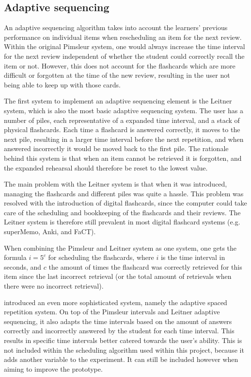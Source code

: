         \subsection{Adaptive sequencing}
        \label{subsec:adaptivesequencing}

An adaptive sequencing algorithm takes into account the learners' previous performance on individual items when rescheduling an item for the next review. Within the original Pimsleur system, one would always increase the time interval for the next review independent of whether the student could correctly recall the item or not. However, this does not account for the flashcards which are more difficult or forgotten at the time of the new review, resulting in the user not being able to keep up with those cards.

The first system to implement an adaptive sequencing element is the Leitner system, which is also the most basic adaptive sequencing system. The user has a number of piles, each representative of a expanded time interval, and a stack of physical flashcards. Each time a flashcard is answered correctly, it moves to the next pile, resulting in a larger time interval before the next repetition, and when answered incorrectly it would be moved back to the first pile. The rationale behind this system is that when an item cannot be retrieved it is forgotten, and the expanded rehearsal should therefore be reset to the lowest value.

The main problem with the Leitner system is that when it was introduced, managing the flashcards and different piles was quite a hassle. This problem was resolved with the introduction of digital flashcards, since the computer could take care of the scheduling and bookkeeping of the flashcards and their reviews. The Leitner system is therefore still prevalent in most digital flashcard systems (e.g. superMemo, Anki, and FaCT).

When combining the Pimsleur and Leitner system as one system, one gets the formula $i = 5^c$ for scheduling the flashcards, where $i$ is the time interval in seconds, and $c$ the amount of times the flashcard was correctly retrieved for this item since the last incorrect retrieval (or the total amount of retrievals when there were no incorrect retrieval).

 introduced an even more sophisticated system, namely the adaptive spaced repetition system. On top of the Pimsleur intervals and Leitner adaptive sequencing, it also adapts the time intervals based on the amount of answers correctly and incorrectly answered by the student for each time interval. This results in specific time intervals better catered towards the user's ability. This is not included within the scheduling algorithm used within this project, because it adds another variable to the experiment. It can still be included however when aiming to improve the prototype.


